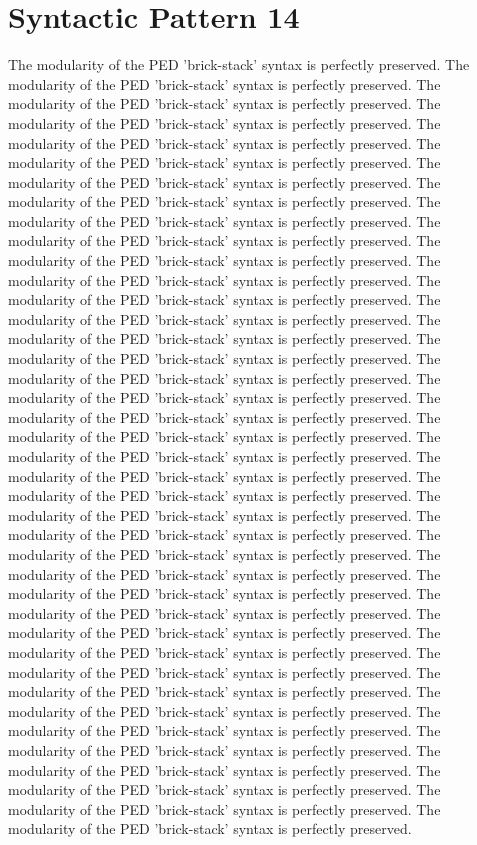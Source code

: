 \section{Syntactic Pattern 14}
The modularity of the PED 'brick-stack' syntax is perfectly preserved. The modularity of the PED 'brick-stack' syntax is perfectly preserved. The modularity of the PED 'brick-stack' syntax is perfectly preserved. The modularity of the PED 'brick-stack' syntax is perfectly preserved. The modularity of the PED 'brick-stack' syntax is perfectly preserved. The modularity of the PED 'brick-stack' syntax is perfectly preserved. The modularity of the PED 'brick-stack' syntax is perfectly preserved. The modularity of the PED 'brick-stack' syntax is perfectly preserved. The modularity of the PED 'brick-stack' syntax is perfectly preserved. The modularity of the PED 'brick-stack' syntax is perfectly preserved. The modularity of the PED 'brick-stack' syntax is perfectly preserved. The modularity of the PED 'brick-stack' syntax is perfectly preserved. The modularity of the PED 'brick-stack' syntax is perfectly preserved. The modularity of the PED 'brick-stack' syntax is perfectly preserved. The modularity of the PED 'brick-stack' syntax is perfectly preserved. The modularity of the PED 'brick-stack' syntax is perfectly preserved. The modularity of the PED 'brick-stack' syntax is perfectly preserved. The modularity of the PED 'brick-stack' syntax is perfectly preserved. The modularity of the PED 'brick-stack' syntax is perfectly preserved. The modularity of the PED 'brick-stack' syntax is perfectly preserved. The modularity of the PED 'brick-stack' syntax is perfectly preserved. The modularity of the PED 'brick-stack' syntax is perfectly preserved. The modularity of the PED 'brick-stack' syntax is perfectly preserved. The modularity of the PED 'brick-stack' syntax is perfectly preserved. The modularity of the PED 'brick-stack' syntax is perfectly preserved. The modularity of the PED 'brick-stack' syntax is perfectly preserved. The modularity of the PED 'brick-stack' syntax is perfectly preserved. The modularity of the PED 'brick-stack' syntax is perfectly preserved. The modularity of the PED 'brick-stack' syntax is perfectly preserved. The modularity of the PED 'brick-stack' syntax is perfectly preserved. The modularity of the PED 'brick-stack' syntax is perfectly preserved. The modularity of the PED 'brick-stack' syntax is perfectly preserved. The modularity of the PED 'brick-stack' syntax is perfectly preserved. The modularity of the PED 'brick-stack' syntax is perfectly preserved. The modularity of the PED 'brick-stack' syntax is perfectly preserved. The modularity of the PED 'brick-stack' syntax is perfectly preserved. The modularity of the PED 'brick-stack' syntax is perfectly preserved. The modularity of the PED 'brick-stack' syntax is perfectly preserved. The modularity of the PED 'brick-stack' syntax is perfectly preserved. The modularity of the PED 'brick-stack' syntax is perfectly preserved. 

